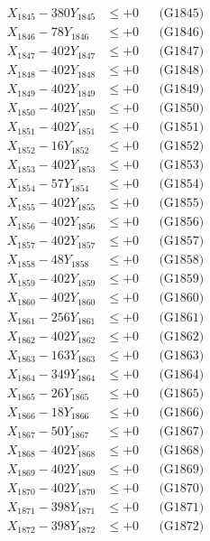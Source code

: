 \documentclass[a4paper,10pt]{article}
\begin{document}
{\begin{align}
X_{1845} - 380Y_{1845} &\leq +0 && \text{(G1845)} \\
X_{1846} - 78Y_{1846} &\leq +0 && \text{(G1846)} \\
X_{1847} - 402Y_{1847} &\leq +0 && \text{(G1847)} \\
X_{1848} - 402Y_{1848} &\leq +0 && \text{(G1848)} \\
X_{1849} - 402Y_{1849} &\leq +0 && \text{(G1849)} \\
X_{1850} - 402Y_{1850} &\leq +0 && \text{(G1850)} \\
\allowbreak
X_{1851} - 402Y_{1851} &\leq +0 && \text{(G1851)} \\
X_{1852} - 16Y_{1852} &\leq +0 && \text{(G1852)} \\
X_{1853} - 402Y_{1853} &\leq +0 && \text{(G1853)} \\
X_{1854} - 57Y_{1854} &\leq +0 && \text{(G1854)} \\
X_{1855} - 402Y_{1855} &\leq +0 && \text{(G1855)} \\
X_{1856} - 402Y_{1856} &\leq +0 && \text{(G1856)} \\
X_{1857} - 402Y_{1857} &\leq +0 && \text{(G1857)} \\
X_{1858} - 48Y_{1858} &\leq +0 && \text{(G1858)} \\
X_{1859} - 402Y_{1859} &\leq +0 && \text{(G1859)} \\
X_{1860} - 402Y_{1860} &\leq +0 && \text{(G1860)} \\
\allowbreak
X_{1861} - 256Y_{1861} &\leq +0 && \text{(G1861)} \\
X_{1862} - 402Y_{1862} &\leq +0 && \text{(G1862)} \\
X_{1863} - 163Y_{1863} &\leq +0 && \text{(G1863)} \\
X_{1864} - 349Y_{1864} &\leq +0 && \text{(G1864)} \\
X_{1865} - 26Y_{1865} &\leq +0 && \text{(G1865)} \\
X_{1866} - 18Y_{1866} &\leq +0 && \text{(G1866)} \\
X_{1867} - 50Y_{1867} &\leq +0 && \text{(G1867)} \\
X_{1868} - 402Y_{1868} &\leq +0 && \text{(G1868)} \\
X_{1869} - 402Y_{1869} &\leq +0 && \text{(G1869)} \\
X_{1870} - 402Y_{1870} &\leq +0 && \text{(G1870)} \\
\allowbreak
X_{1871} - 398Y_{1871} &\leq +0 && \text{(G1871)} \\
X_{1872} - 398Y_{1872} &\leq +0 && \text{(G1872)} \\

\end{align}}
\end{document}
